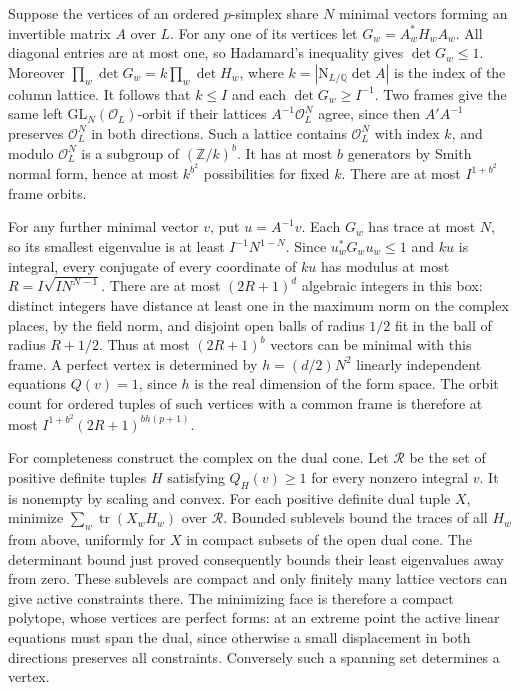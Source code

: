 \documentclass[11pt]{amsart}
\theoremstyle{definition}
\theoremstyle{remark}
\begin{document}
Suppose the vertices of an ordered $p$-simplex share $N$ minimal
vectors forming an invertible matrix $A$ over $L$. For any one of its
vertices let $G_w=A_w^*H_w A_w$. All diagonal entries are at most one,
so Hadamard's inequality gives $\det G_w\le1$. Moreover
$\prod_w\det G_w=k\prod_w\det H_w$, where
$k=|\mathrm N_{L/\mathbb Q}\det A|$ is the index of the column lattice.
It follows that $k\le I$ and each $\det G_w\ge I^{-1}$.
Two frames give the same left $\mathrm{GL}_N(\mathcal O_L)$-orbit
if their lattices $A^{-1}\mathcal O_L^N$ agree, since then
$A'A^{-1}$ preserves $\mathcal O_L^N$ in both directions.
Such a lattice contains $\mathcal O_L^N$ with index $k$, and modulo
$\mathcal O_L^N$ is a subgroup of $(\mathbb Z/k)^b$. It has at most
$b$ generators by Smith normal form, hence at most $k^{b^2}$
possibilities for fixed $k$. There are at most $I^{1+b^2}$ frame orbits.

For any further minimal vector $v$, put $u=A^{-1}v$. Each $G_w$
has trace at most $N$, so its smallest eigenvalue is at least
$I^{-1}N^{1-N}$. Since $u_w^*G_w u_w\le1$ and $ku$ is integral,
every conjugate of every coordinate of $ku$ has modulus at most
$R=I\sqrt{IN^{N-1}}$. There are at most $(2R+1)^d$ algebraic integers
in this box: distinct integers have distance at least one in the
maximum norm on the complex places, by the field norm, and disjoint
open balls of radius $1/2$ fit in the ball of radius $R+1/2$.
Thus at most $(2R+1)^b$ vectors can be minimal with this frame.
A perfect vertex is determined by $h=(d/2)N^2$ linearly independent
equations $Q(v)=1$, since $h$ is the real dimension of the form
space. The orbit count for ordered tuples of such vertices with a common
frame is therefore at most $I^{1+b^2}(2R+1)^{bh(p+1)}$.

For completeness construct the complex on the dual cone. Let
$\mathcal R$ be the set of positive definite tuples $H$ satisfying
$Q_H(v)\ge1$ for every nonzero integral $v$. It is nonempty by scaling
and convex. For each positive definite dual tuple $X$, minimize
$\sum_w\operatorname{tr}(X_wH_w)$ over $\mathcal R$. Bounded
sublevels bound the traces of all $H_w$ from above, uniformly for
$X$ in compact subsets of the open dual cone. The determinant bound
just proved consequently bounds their least eigenvalues away from
zero. These sublevels are compact and only finitely many lattice
vectors can give active constraints there. The minimizing face is
therefore a compact polytope, whose vertices are perfect forms:
at an extreme point the active linear equations must span the dual,
since otherwise a small displacement in both directions preserves
all constraints. Conversely such a spanning set determines a vertex.
\end{document}
